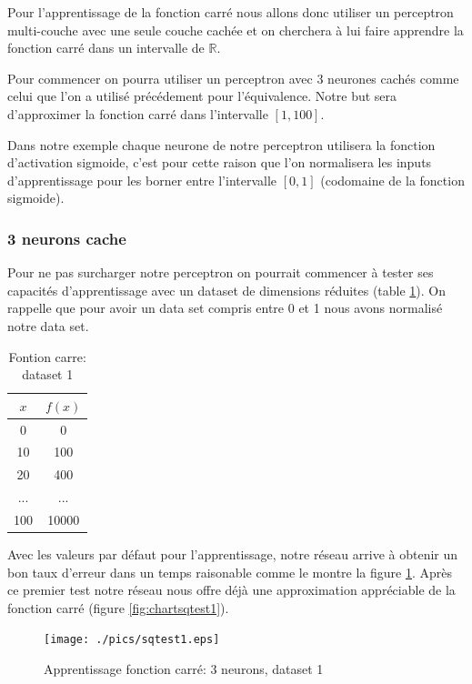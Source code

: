 \documentclass[twoside,openright,a4paper,11pt,french]{article}
\begin{document}
Pour l'apprentissage de la fonction carré nous allons donc utiliser un perceptron
multi-couche avec une seule couche cachée et on cherchera à lui faire apprendre
la fonction carré dans un intervalle de $\mathbb{R}$.

Pour commencer on pourra utiliser un perceptron avec 3 neurones cachés comme
celui que l'on a utilisé précédement pour l'équivalence. Notre but sera
d'approximer la fonction carré dans l'intervalle $[1,100]$.

Dans notre exemple chaque neurone de notre perceptron utilisera la fonction
d'activation sigmoide, c'est pour cette raison que l'on normalisera les inputs
d'apprentissage pour les borner entre l'intervalle $[0,1]$ (codomaine de la
fonction sigmoide).

\subsubsection{3 neurons cache}

Pour ne pas surcharger notre  perceptron on pourrait commencer à tester
ses capacités d'apprentissage avec un dataset de dimensions réduites (table
\ref{tab:fqt1}). On rappelle que pour avoir un data set compris entre 0 et 1
nous avons normalisé notre data set.

\begin{table}[ht]
  \centering
  \begin{tabular}{| c | c |}
    \hline
    \textbf{$x$} & \textbf{$f(x)$}\\
    \hline
    0 & 0 \\
    \hline
    10 & 100 \\
    \hline
    20 & 400 \\
    \hline
    ... & ... \\
    \hline
    100 & 10000 \\
    \hline
  \end{tabular}
  \caption{Fontion carre: dataset 1}
  \label{tab:fqt1}
\end{table}

Avec les valeurs par défaut pour l'apprentissage, notre réseau arrive à obtenir
un bon taux d'erreur dans un temps raisonable comme le montre la figure
\ref{fig:sqtest1}. Après ce premier test notre réseau nous offre déjà une
approximation appréciable de la fonction carré (figure \ref{fig:chartsqtest1}).

\begin{figure}[ht]
\centering
\texttt{[image: ./pics/sqtest1.eps]}
\caption{Apprentissage fonction carré: 3 neurons, dataset 1}
\label{fig:sqtest1}
\end{figure}
\end{document}
